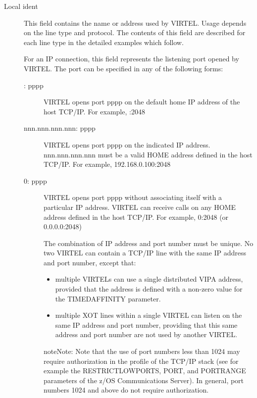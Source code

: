 \documentclass[letterpaper,10pt,english]{sphinxmanual}
\begin{document}
\label{\detokenize{connectivity_guide:bookmark13}}\begin{description}
\item[{Local ident}] \leavevmode
This field contains the name or address used by VIRTEL. Usage
depends on the line type and protocol. The contents of this field
are described for each line type in the detailed examples which
follow.

For an IP connection, this field represents the listening port
opened by VIRTEL. The port can be specified in any of the following
forms:
\begin{description}
\item[{: pppp}] \leavevmode
VIRTEL opens port pppp on the default home IP address of the host
TCP/IP. For example, :2048

\item[{nnn.nnn.nnn.nnn: pppp}] \leavevmode
VIRTEL opens port pppp on the indicated IP address. nnn.nnn.nnn.nnn
must be a valid HOME address defined in the host TCP/IP. For
example, 192.168.0.100:2048

\item[{0: pppp}] \leavevmode
VIRTEL opens port pppp without associating itself with a particular
IP address. VIRTEL can receive calls on any HOME address defined in
the host TCP/IP. For example, 0:2048 (or 0.0.0.0:2048)

The combination of IP address and port number must be unique. No two
VIRTEL can contain a TCP/IP line with the same IP address and port
number, except that:
\begin{itemize}
\item {} 
multiple VIRTELs can use a single distributed VIPA address, provided that the address is defined with a non-zero value for the TIMEDAFFINITY parameter.

\item {} 
multiple XOT lines within a single VIRTEL can listen on the same IP address and port number, providing that this same address and port number are not used by another VIRTEL.

\end{itemize}

\begin{sphinxadmonition}{note}{Note:}
Note that the use of port numbers less than 1024 may require authorization in the profile of the TCP/IP stack (see for example the RESTRICTLOWPORTS, PORT, and PORTRANGE parameters of the z/OS Communications Server). In general, port numbers 1024 and above do not require authorization.
\end{sphinxadmonition}


\end{description}
\end{description}
\end{document}
